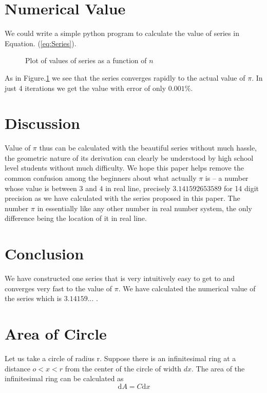 \documentclass{IEEEtran}
\theoremstyle{definition} \newtheorem{Definition}{Def{\,}inition}
\begin{document}
\section{Numerical Value}
We could write a simple python program to calculate the value of series in Equation. (\ref{eq:Series}).

\begin{figure}[h!]
	\centering
	\scalebox{0.8}{}
	\caption{Plot of values of series as a function of $n$}
	\label{fig:PISeriesPlot}
\end{figure}
As in Figure.\ref{fig:PISeriesPlot} we see that the series converges rapidly to the actual value of $\pi$. In just 4 iterations we get the value with error of only $0.001\%$.
\section{Discussion}
Value of $\pi$ thus can be calculated with the beautiful series without much hassle, the geometric nature of its derivation can clearly be understood by high school level students without much difficulty.  We hope this paper helps remove the common confusion among the beginners about what actually $\pi$ is -- a number whose value is between $3$ and $4$ in real line, precisely $3.141592653589$ for 14 digit precision as we have calculated with the series proposed in this paper. The number $\pi$ in essentially like any  other number in real number system, the only difference being the location of it in real line. 

\section{Conclusion}
We have constructed one series that is very intuitively easy to get to and converges very fast to the value of $\pi$. We have calculated the numerical value of the series which is $3.14159...$ \cite{fat}.
\appendix
\setcounter{section}{1}
\section{Area of Circle} \label{apx:AreaOfCircle}
Let us take a circle of radius r. Suppose there is an infinitesimal ring at a distance $o <x<r$ from the center of the circle of width $dx$. The area of the infinitesimal ring can be calculated as 
\begin{equation} \label{eq:infarea}
	\mathrm{d}A = C\mathrm{d}x 
\end{equation}
\end{document}
